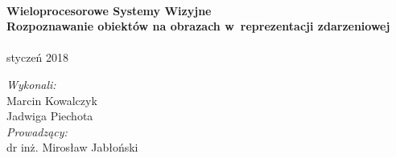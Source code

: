 \begin{titlepage}
\HRule \\[0.4cm]
{ \huge \bfseries Wieloprocesorowe Systemy Wizyjne\\[1cm]Rozpoznawanie obiektów na obrazach w~reprezentacji zdarzeniowej}\\[0.4cm] %
\HRule \\[1cm]%
 



{\large styczeń 2018}\\[1.5cm] %



\begin{flushleft}
\Large
\emph{Wykonali:}\\
Marcin Kowalczyk\\
Jadwiga Piechota\\[1cm]

 \emph{Prowadzący:}\\
dr inż. Mirosław Jabłoński\\[3cm] %
 
\end{flushleft}
\end{titlepage}
\clearpage
\setcounter{page}{2}